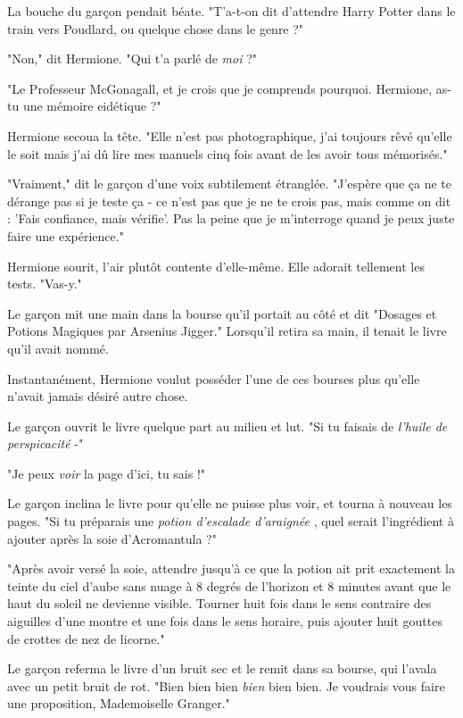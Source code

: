 La bouche du garçon pendait béate. "T'a-t-on dit d'attendre Harry Potter dans le train vers Poudlard, ou quelque chose dans le genre ?"

"Non," dit Hermione. "Qui t'a parlé de \emph{moi}  ?"

"Le Professeur McGonagall, et je crois que je comprends pourquoi. Hermione, as-tu une mémoire eidétique ?"

Hermione secoua la tête. "Elle n'est pas photographique, j'ai toujours rêvé qu'elle le soit mais j'ai dû lire mes manuels cinq fois avant de les avoir tous mémorisés."

"Vraiment," dit le garçon d'une voix subtilement étranglée. "J'espère que ça ne te dérange pas si je teste ça - ce n'est pas que je ne te crois pas, mais comme on dit : 'Fais confiance, mais vérifie'. Pas la peine que je m'interroge quand je peux juste faire une expérience."

Hermione sourit, l'air plutôt contente d'elle-même. Elle adorait tellement les tests. "Vas-y."

Le garçon mit une main dans la bourse qu'il portait au côté et dit "Dosages et Potions Magiques par Arsenius Jigger." Lorsqu'il retira sa main, il tenait le livre qu'il avait nommé.

Instantanément, Hermione voulut posséder l'une de ces bourses plus qu'elle n'avait jamais désiré autre chose.

Le garçon ouvrit le livre quelque part au milieu et lut. "Si tu faisais de \emph{l'huile de perspicacité}  -"

"Je peux \emph{voir}  la page d'ici, tu sais !"

Le garçon inclina le livre pour qu'elle ne puisse plus voir, et tourna à nouveau les pages. "Si tu préparais une \emph{potion d'escalade d'araignée} , quel serait l'ingrédient à ajouter après la soie d'Acromantula ?"

"Après avoir versé la soie, attendre jusqu'à ce que la potion ait prit exactement la teinte du ciel d'aube sans nuage à 8 degrés de l'horizon et 8 minutes avant que le haut du soleil ne devienne visible. Tourner huit fois dans le sens contraire des aiguilles d'une montre et une fois dans le sens horaire, puis ajouter huit gouttes de crottes de nez de licorne."

Le garçon referma le livre d'un bruit sec et le remit dans sa bourse, qui l'avala avec un petit bruit de rot. "Bien bien bien \emph{bien}  bien bien. Je voudrais vous faire une proposition, Mademoiselle Granger."

